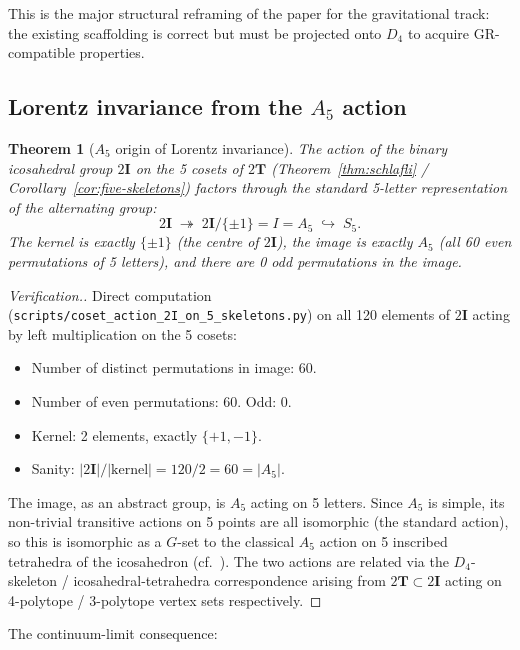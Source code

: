\documentclass[12pt]{article}
\newtheorem{theorem}{Theorem}
\newcommand{\twoT}{2\mathbf{T}}
\newcommand{\twoI}{2\mathbf{I}}
\begin{document}
This is the major structural reframing of the paper for the gravitational track: the existing scaffolding is correct but must be projected onto $D_4$ to acquire GR-compatible properties.

\subsection{Lorentz invariance from the $A_5$ action}\label{sec:gr:lorentz}

\begin{theorem}[$A_5$ origin of Lorentz invariance]\label{thm:A5action}
The action of the binary icosahedral group $\twoI$ on the 5 cosets of $\twoT$ (Theorem~\ref{thm:schlafli} / Corollary~\ref{cor:five-skeletons}) factors through the standard 5-letter representation of the alternating group:
\[
\twoI \;\twoheadrightarrow\; \twoI / \{\pm 1\} = I = A_5 \;\hookrightarrow\; S_5.
\]
The kernel is exactly $\{\pm 1\}$ (the centre of $\twoI$), the image is exactly $A_5$ (all 60 even permutations of 5 letters), and there are 0 odd permutations in the image.
\end{theorem}

\begin{proof}[Verification.]
Direct computation (\texttt{scripts/coset\_action\_2I\_on\_5\_skeletons.py}) on all 120 elements of $\twoI$ acting by left multiplication on the 5 cosets:
\begin{itemize}
    \item Number of distinct permutations in image: 60.
    \item Number of even permutations: 60. Odd: 0.
    \item Kernel: 2 elements, exactly $\{+1, -1\}$.
    \item Sanity: $|\twoI| / |\mathrm{kernel}| = 120 / 2 = 60 = |A_5|$.
\end{itemize}
The image, as an abstract group, is $A_5$ acting on 5 letters. Since $A_5$ is simple, its non-trivial transitive actions on 5 points are all isomorphic (the standard action), so this is isomorphic as a $G$-set to the classical $A_5$ action on 5 inscribed tetrahedra of the icosahedron (cf.~\citep{Coxeter1973}). The two actions are related via the $D_4$-skeleton / icosahedral-tetrahedra correspondence arising from $\twoT \subset \twoI$ acting on 4-polytope / 3-polytope vertex sets respectively.
\end{proof}

The continuum-limit consequence:
\end{document}

